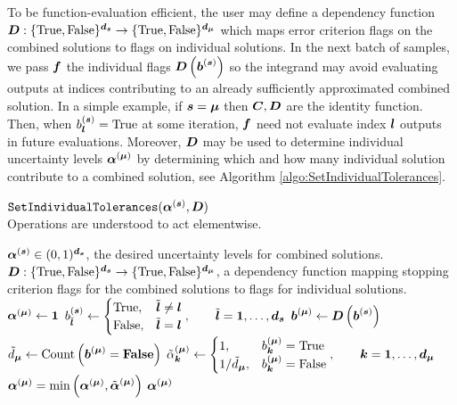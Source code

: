 \documentclass{article}[12pt]
\begin{document}
To be function-evaluation efficient, the user may define a dependency function $\bD: \tfset^{\bd_{\bs}} \to \tfset^{\bd_{\bmu}}$ which maps error criterion flags on the combined solutions to flags on individual solutions. In the next batch of samples, we pass $\bf$ the individual flags $\bD\left(\bb^{(\bs)}\right)$ so the integrand may avoid evaluating outputs at indices contributing to an already sufficiently approximated combined solution. In a simple example, if $\bs=\bmu$ then $\bC,\bD$ are the identity function. Then, when $b^{(\bs)}_{\bl}=\True$ at some iteration, $\bf$ need not evaluate index ${\bl}$ outputs in future evaluations. Moreover, $\bD$ may be used to determine individual uncertainty levels $\balpha^{(\bmu)}$ by determining which and how many individual solution contribute to a combined solution, see Algorithm \ref{algo:SetIndividualTolerances}.

\begin{algorithm}[h!]
    \caption{$\texttt{SetIndividualTolerances}(\balpha^{(\bs)},\bD)$ \\ Operations are understood to act elementwise.}
    \label{algo:SetIndividualTolerances}
    \begin{algorithmic}
    \Require $\balpha^{(\bs)} \in (0,1)^{\bd_{\bs}}$, the desired uncertainty levels for combined solutions. 
    \Require $\bD: \tfset^{\bd_{\bs}} \to \tfset^{\bd_{\bmu}}$, a dependency function mapping stopping criterion flags for the combined solutions to flags for individual solutions. \\
    \hrulefill
    \State $\balpha^{(\bmu)} \gets \boldsymbol{1}$
        \State $b^{(\bs)}_{\tilde{\bl}} \gets \begin{cases} \True, & \tilde{\bl} \neq \bl \\ \False, & \tilde{\bl} = \bl \end{cases}, \qquad \tilde{\bl}=\boldsymbol{1},\dots,\bd_{\bs}$
        \State $\bb^{(\bmu)} \gets \bD\left(\bb^{(\bs)}\right)$
        \State $\tilde{d}_{\bmu} \gets \text{Count}\left(\bb^{(\bmu)}=\textbf{\False}\right)$
        \State $\tilde{\alpha}_{\bk}^{(\bmu)} \gets \begin{cases} 1, & b^{(\bmu)}_{\bk} = \True \\ 1/\tilde{d}_{\bmu}, & b^{(\bmu)}_{\bk} = \False \end{cases}, \qquad \bk=\boldsymbol{1},\dots,\bd_{\bmu}$
        \State $\balpha^{(\bmu)} = \min\left(\balpha^{(\bmu)},\tilde{\balpha}^{(\bmu)}\right)$
    \EndFor
    \State \Return $\balpha^{(\bmu)}$
    \end{algorithmic}
\end{algorithm}
\end{document}
